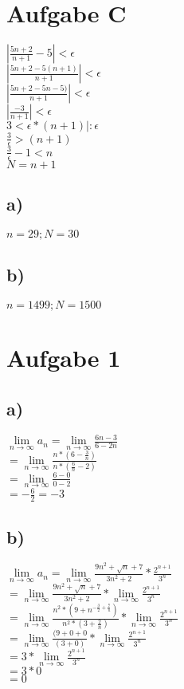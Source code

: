 \documentclass{article}
\begin{document}
	\section*{Aufgabe C}
	$|\frac{5n + 2}{n+ 1} - 5| < \epsilon$ \\
	$|\frac{5n + 2 -5(n+1)}{n+1}| < \epsilon$ \\
	$|\frac{5n + 2 -5n - 5)}{n+1}| < \epsilon$ \\
	$|\frac{-3}{n+1}| < \epsilon$ \\
	$ 3 < \epsilon * (n+1) | : \epsilon$ \\
	$ \frac{3}{\epsilon} > (n+1)$ \\
	$\frac{3}{\epsilon} - 1 < n $ \\
	$N = n + 1$ \\
	\subsection*{a)}
	$n = 29; N = 30$
	\subsection*{b)}
	$n = 1499; N = 1500$
	
	\section*{Aufgabe 1}
	\subsection*{a)}
	$\lim\limits_{n\to\infty}a_{n} = \lim\limits_{n\to\infty} \frac{6n - 3}{6 - 2n} $ \\
	$= \lim\limits_{n\to\infty} \frac{n*(6 - \frac{3}{n})}{n * (\frac{6}{n} - 2)} $ \\
	$= \lim\limits_{n\to\infty} \frac{6 - 0}{0 - 2} $ \\
	$= -\frac{6}{2} = -3$
	
	\subsection*{b)}
	$\lim\limits_{n\to\infty} a_{n} = \lim\limits_{n\to\infty} \frac{9n^{2} + \sqrt{n}+7}{3n^{2} + 2} * \frac{2^{n+1}}{3^{n}} $ \\
	$ = \lim\limits_{n\to\infty} \frac{9n^{2} + \sqrt{n}+7}{3n^{2} + 2} * \lim\limits_{n\to\infty}\frac{2^{n+1}}{3^{n}} $ \\
	$ = \lim\limits_{n\to\infty} \frac{n^{2} * (9 + n^{-\frac{3}{2}+\frac{7}{n}})}{n^{2}*(3 + \frac{2}{n})} * \lim\limits_{n\to\infty}\frac{2^{n+1}}{3^{n}} $ \\
	$ = \lim\limits_{n\to\infty} \frac{(9 + 0 + 0}{(3 + 0)} * \lim\limits_{n\to\infty}\frac{2^{n+1}}{3^{n}} $ \\
	$ = 3 * \lim\limits_{n\to\infty}\frac{2^{n+1}}{3^{n}} $ \\
	$ = 3 * 0 $ \\
	$ = 0 $
	
\end{document}
